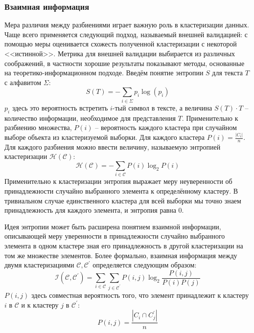 \subsubsection{Взаимная информация}
Мера различия между разбиениями играет важную роль в кластеризации данных. Чаще всего применяется следующий подход, называемый внешней валидацией: с помощью меры оценивается схожесть полученной кластеризации с некоторой <<истинной>>. Метрика для внешней валидации выбирается из различных соображений, в частности хорошие результаты показывают методы, основанные на теоретико-информационном подходе. Введём понятие энтропии $S$ для текста $T$ с алфавитом $\Sigma$:
\begin{equation}
	S(T) = -\sum_{i \in \Sigma} p_i \log(p_i) 
\end{equation}
$p_i$ здесь это вероятность встретить $i$-тый символ в тексте, а величина $S(T) \cdot T$ -- количество информации, необходимое для представления $T$. Применительно к разбиению множества, $P(i)$ -- вероятность каждого кластера при случайном выборе объекта из кластеризуемой выборки. Для каждого кластера $P(i) = \frac{|C_i|}{n}$. Для каждого разбиения можно ввести величину, называемую энтропией кластеризации $\mathcal{H}(\mathcal{C})$:
\begin{equation}
	\mathcal{H}(\mathcal{C}) = - \sum_{i \in \mathcal{C}} P(i) \log_2P(i)
\end{equation}
Применительно к кластеризации энтропия выражает меру неуверенности об принадлежности случайно выбранного элемента к определённому кластеру. В тривиальном случае единственного кластера для всей выборки мы точно знаем принадлежность для каждого элемента, и энтропия равна 0.

Идея энтропии может быть расширена понятием взаимной информации, описывающей меру уверенности в принадлежности случайно выбранного элемента в одном кластере зная его принадлежность в другой кластеризации на том же множестве элементов. Более формально, взаимная информация между двумя кластеризациями $\mathcal{C}, \mathcal{C}^\prime$ определяется следующим образом:
\begin{equation}
	\mathcal{I}(\mathcal{C}, \mathcal{C}^\prime) = \sum_{i \in \mathcal{C}} \sum_{j \in \mathcal{C}^\prime} P(i,j) \log_2 \frac{P(i,j)}{P(i)P(j)}
\end{equation} 
$P(i,j)$ здесь совместная вероятность того, что элемент принадлежит к кластеру $i$ в $\mathcal{C}$ и к кластеру $j$ в $\mathcal{C}^\prime$:
\begin{equation}
	P(i,j) = \frac{|C_i \cap C_j^\prime|}{n}
\end{equation}

